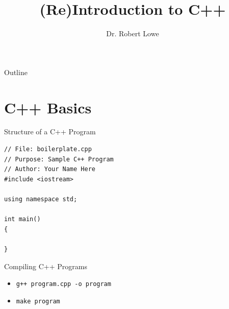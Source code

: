 \documentclass[handout]{beamer}
\title{(Re)Introduction to C++}
\author{Dr. Robert Lowe\\}
\institute[Maryville College] %
{
  Division of Mathematics and Computer Science\\
  Maryville College
}
\date[]{}
\begin{document}
\begin{frame}
  \titlepage
\end{frame}

\begin{frame}{Outline}
  \tableofcontents
\end{frame}





\section{C++ Basics}

\begin{frame}[fragile]{Structure of a C++ Program}
\begin{verbatim}
// File: boilerplate.cpp
// Purpose: Sample C++ Program
// Author: Your Name Here
#include <iostream>

using namespace std;

int main()
{

}
\end{verbatim}
\end{frame}

\begin{frame}[fragile]{Compiling C++ Programs}
    \begin{itemize}
        \item \verb!g++ program.cpp -o program!
        \item \verb!make program!
    \end{itemize}
\end{frame}
\end{document}
